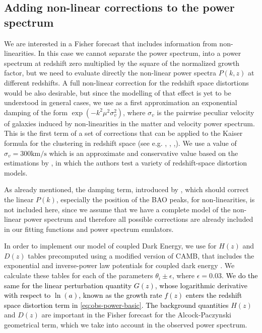 \subsection{Adding non-linear corrections to the power spectrum\label{sub:Adding-non-linear-corrections}}

We are interested in a Fisher forecast that includes information from
non-linearities. In this case we cannot separate the power spectrum,
into a power spectrum at redshift zero multiplied by the square of
the normalized growth factor, but we need to evaluate directly the
non-linear power spectra $P(k,z)$ at different redshifts. A full
non-linear correction for the redshift space distortions would be
also desirable, but since the modelling of that effect is yet to be
understood in general cases, we use as a first approximation an exponential
damping of the form $\exp(-k^{2}\mu^{2}\sigma_{v}^{2})$, where $\sigma_{v}$
is the pairwise peculiar velocity of galaxies induced by non-linearities
in the matter and velocity power spectrum. This is the first term
of a set of corrections that can be applied to the Kaiser formula
\citep{kaiser_clustering_1987} for the clustering in redshift space
(see e.g. \cite{de_la_torre_modelling_2012}, \cite{scoccimarro_redshift-space_2004},
\cite{taruya_baryon_2010},\cite{wang_toward_2012}). We use a value
of $\sigma_{v}=300\mbox{km}/\mbox{s}$ which is an approximate and
conservative value based on the estimations by \citep{de_la_torre_modelling_2012},
in which the authors test a variety of redshift-space distortion models.

As already mentioned, the damping term, introduced by \citep{seo2007improved},
which should correct the linear $P(k)$, especially the position of
the BAO peaks, for non-linearities, is not included here, since we
assume that we have a complete model of the non-linear power spectrum
and therefore all possible corrections are already included in our
fitting functions and power spectrum emulators.

In order to implement our model of coupled Dark Energy, we use for
$H(z)$ and $D(z)$ tables precomputed using a modified version of
CAMB, that includes the exponential and inverse-power law potentials
for coupled dark energy \cite{amendola_testing_2012,pettorino_testing_2013}.
We calculate these tables for each of the parameters $\theta_{i}\pm\epsilon$,
where $\epsilon=0.03.$ \textcolor{black}{We do the same for the linear
perturbation quantity $G(z)$, whose logarithmic derivative with respect
to $\ln(a)$, known as the growth rate $f(z)$ enters the redshift
space distortion term in \ref{eq:obs-power-basic}. The background quantities
}$H(z)$ and $D(z)$ are important in the Fisher forecast for the
Alcock-Paczynski geometrical term, which we take into account in the
observed power spectrum.

